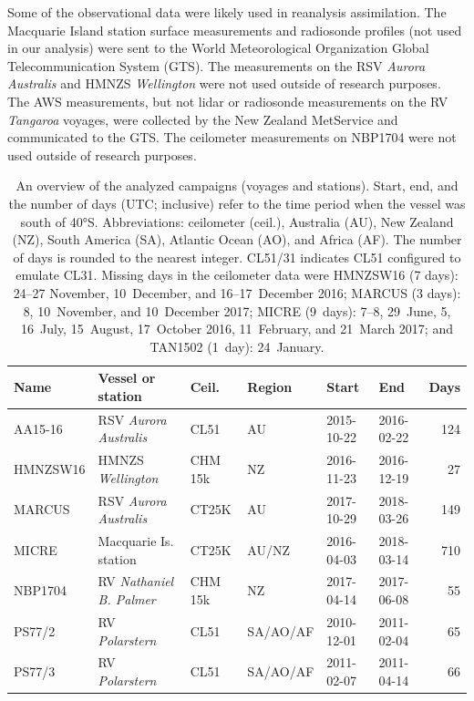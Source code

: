 \documentclass[draft]{agujournal2019}
\begin{document}
Some of the observational data were likely used in reanalysis assimilation. The Macquarie Island station surface measurements and radiosonde profiles (not used in our analysis) were sent to the World Meteorological Organization Global Telecommunication System (GTS). The measurements on the RSV \textit{Aurora Australis} and HMNZS \textit{Wellington} were not used outside of research purposes. The AWS measurements, but not lidar or radiosonde measurements on the RV \textit{Tangaroa} voyages, were collected by the New Zealand MetService and communicated to the GTS. The ceilometer measurements on NBP1704 were not used outside of research purposes.

\begin{table}[p!]
\caption{
An overview of the analyzed campaigns (voyages and stations). Start, end, and the number of days (UTC; inclusive) refer to the time period when the vessel was south of 40°S. Abbreviations: ceilometer (ceil.), Australia (AU), New Zealand (NZ), South America (SA), Atlantic Ocean (AO), and Africa (AF). The number of days is rounded to the nearest integer. CL51/31 indicates CL51 configured to emulate CL31. Missing days in the ceilometer data were HMNZSW16 (7 days): 24–27 November, 10~December, and 16–17~December 2016; MARCUS (3 days): 8, 10~November, and 10~December 2017; MICRE (9~days): 7–8, 29~June, 5, 16~July, 15~August, 17~October 2016, 11~February, and 21~March 2017; and TAN1502 (1~day): 24~January.
}
\label{tab:voyages}
\centering
\small
\begin{tabular}{llllllr}
\textbf{Name} & \textbf{Vessel or station} & \textbf{Ceil.} & \textbf{Region} & \textbf{Start} & \textbf{End} & \textbf{Days}\\
\hline
AA15-16  & RSV \emph{Aurora Australis}   & CL51    & AU       & 2015-10-22 & 2016-02-22 & 124 \\
HMNZSW16 & HMNZS \emph{Wellington}       & CHM 15k & NZ       & 2016-11-23 & 2016-12-19 & 27 \\
MARCUS   & RSV \emph{Aurora Australis}   & CT25K   & AU       & 2017-10-29 & 2018-03-26 & 149 \\
MICRE    & Macquarie Is. station         & CT25K   & AU/NZ    & 2016-04-03 & 2018-03-14 & 710 \\
NBP1704  & RV \emph{Nathaniel B. Palmer} & CHM 15k & NZ       & 2017-04-14 & 2017-06-08 & 55 \\
PS77/2   & RV \emph{Polarstern}          & CL51    & SA/AO/AF & 2010-12-01 & 2011-02-04 & 65 \\
PS77/3   & RV \emph{Polarstern}          & CL51    & SA/AO/AF & 2011-02-07 & 2011-04-14 & 66 \\

\end{tabular}
\end{table}
\end{document}

